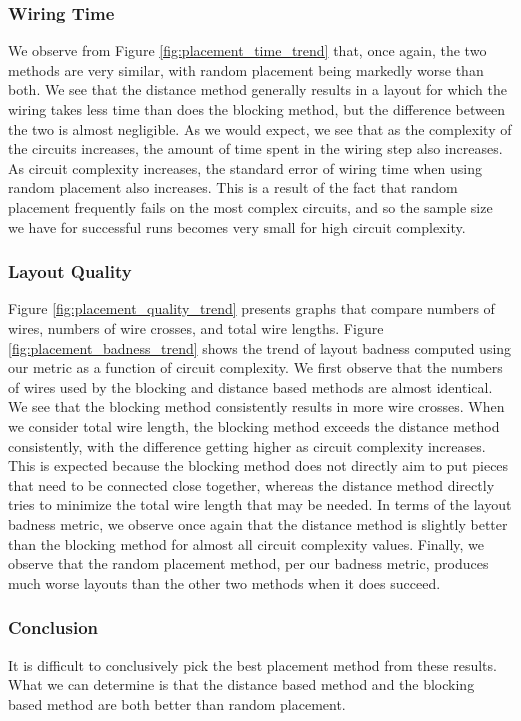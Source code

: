 \subsubsection{Wiring Time}
We observe from
Figure \ref{fig:placement_time_trend} that, once again, the two methods are
very similar, with random placement being markedly worse than both.
We see that the distance method generally results in a layout for which the
wiring takes less time than does the blocking method,
but the difference between the two is
almost negligible. As we would expect, we see that as the complexity
of the circuits increases, the amount of time spent in the wiring step also
increases. As circuit complexity increases, the standard error of
wiring time
when using random placement also increases. This is a result of
the fact that random placement frequently fails on the most complex
circuits, and so the sample size we have for successful runs becomes very small
for high circuit complexity.

\subsubsection{Layout Quality}
Figure
\ref{fig:placement_quality_trend} presents graphs that compare numbers of wires,
numbers of wire crosses, and total wire lengths.
Figure \ref{fig:placement_badness_trend} shows the trend of layout badness
computed using our metric as a function of circuit complexity.
We first observe that the numbers of wires used by the blocking and distance
based methods are almost identical. We see that the
blocking method consistently results in more wire crosses. When we consider
total wire length, the blocking
method exceeds the distance method consistently, with the difference getting
higher as circuit complexity increases.
This is expected because the blocking method does not directly aim to
put pieces that need to be connected close together, whereas the distance method
directly tries to minimize the total wire length that may be needed. In terms
of the layout badness metric, we observe once again that the distance method
is slightly better than the blocking method for almost all circuit complexity
values. Finally, we observe that the random
placement method, per our badness metric, produces much worse layouts than the
other two methods when it does succeed.

\subsubsection{Conclusion}
It is difficult to conclusively pick the best placement method from these
results. What we can determine is that the distance based method and the
blocking based method are both better than random placement.

